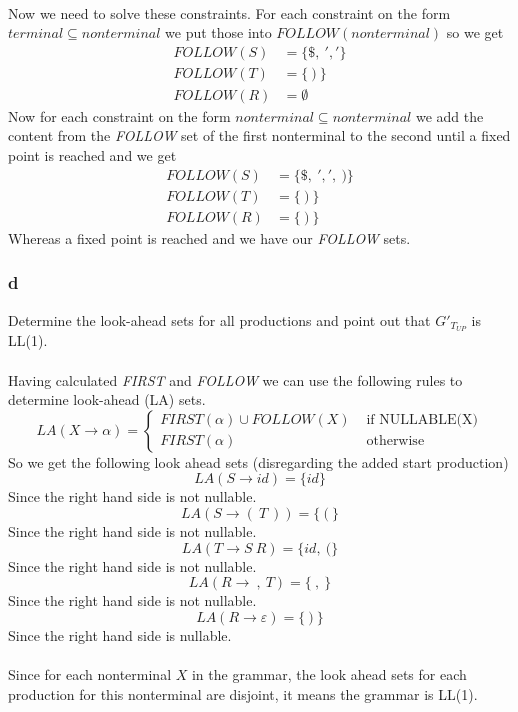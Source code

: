 \documentclass[12pt]{article}
\begin{document}
\\
Now we need to solve these constraints. For each constraint on the form $terminal \subseteq nonterminal$ we put those into $FOLLOW(nonterminal)$ so we get
\begin{align*}
FOLLOW(S) &= \{\$,\:','\} \\ 
FOLLOW(T) &= \{\:)\:\} \\
FOLLOW(R) &= \emptyset
\end{align*}
Now for each constraint on the form $nonterminal \subseteq nonterminal$ we add the content from the \textit{FOLLOW} set of the first nonterminal to the second until a fixed point is reached and we get
\begin{align*}
FOLLOW(S) &= \{\$,\:',',\:)\} \\
FOLLOW(T) &= \{\:)\:\} \\
FOLLOW(R) &= \{\:)\:\}
\end{align*}
Whereas a fixed point is reached and we have our \textit{FOLLOW} sets.

\subsubsection*{d}
Determine the look-ahead sets for all productions and point out that $G'_{T_{UP}}$ is LL(1).\\
\\
Having calculated \textit{FIRST} and \textit{FOLLOW} we can use the following rules to determine look-ahead (LA) sets.
$$
LA(X\rightarrow \alpha) = \left\{ \begin{array}{rl}
FIRST(\alpha) \cup FOLLOW(X) &\mbox{ if NULLABLE(X)} \\
FIRST(\alpha) &\mbox{ otherwise}
\end{array} \right.
$$
So we get the following look ahead sets (disregarding the added start production) \\
$$LA(S \rightarrow id) = \{id\}$$
Since the right hand side is not nullable.
$$LA(S \rightarrow (\:T\:)) = \{\:(\:\}$$
Since the right hand side is not nullable.
$$LA(T \rightarrow S\:R) = \{id,\:(\}$$
Since the right hand side is not nullable.
$$LA(R \rightarrow \:,\:T) = \{\:,\:\}$$
Since the right hand side is not nullable.
$$LA(R \rightarrow \varepsilon) = \{\:)\:\}$$
Since the right hand side is nullable.\\
\\
Since for each nonterminal $X$ in the grammar, the look ahead sets for each production for this nonterminal are disjoint, it means the grammar is LL(1).
\end{document}
